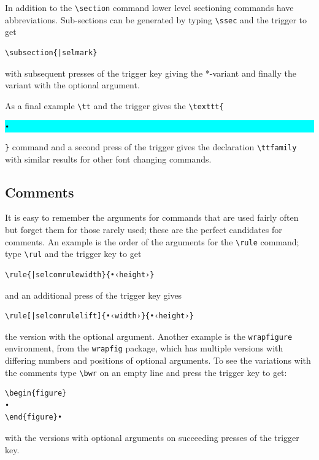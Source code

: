 \documentclass[11pt]{article}
\newcommand{\selmark}{\colorbox{cyan}{\rule[-0.5ex]{0ex}{2.1ex}\texttt{•}}}
\begin{document}
In addition to the \verb|\section| command lower level sectioning commands have abbreviations. Sub-sections can be generated by typing \verb|\ssec| and the trigger to get
\begin{verbatim}
\subsection{|selmark}
\end{verbatim}
with subsequent presses of the trigger key giving the *-variant and finally the variant with the optional argument.

As a final example \verb|\tt| and the trigger gives the \verb|\texttt{|\selmark\verb|}| command and a second press of the trigger gives the declaration \verb|\ttfamily| with similar results for other font changing commands.

\subsection*{Comments}

It is easy to remember the arguments for commands that are used fairly often but forget them for those rarely used; these are the perfect candidates for comments. An example is the order of the arguments for the \verb|\rule| command; type \verb|\rul| and the trigger key to get
\begin{verbatim}
\rule{|selcomrulewidth}{•‹height›}
\end{verbatim}
and an additional press of the trigger key gives
\begin{verbatim}
\rule[|selcomrulelift]{•‹width›}{•‹height›}
\end{verbatim}
the version with the optional argument. Another example is the \texttt{wrapfigure} environment, from the \texttt{wrapfig} package, which has multiple versions with differing numbers and positions of optional arguments. To see the variations with the comments type \verb|\bwr| on an empty line and press the trigger key to get:
\begin{verbatim}
\begin{figure}
•
\end{figure}•
\end{verbatim}
with the versions with optional arguments on succeeding presses of the trigger key.
\end{document}
